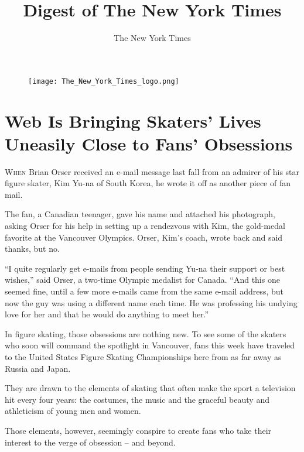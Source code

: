 ﻿\documentclass[12pt]{article}
\title{Digest of The New York Times}
\author{The New York Times}
\begin{document}
\date{}
\thispagestyle{empty}

\begin{figure}
\texttt{[image: The\_New\_York\_Times\_logo.png]}
\vspace{-15ex}
\end{figure}
\renewcommand\contentsname{}
{\footnotesize\textsf{\tableofcontents}}

\clearpage
\setcounter{page}{1}

\section{Web Is Bringing Skaters' Lives Uneasily Close to Fans' Obsessions}

\lettrine{W}{hen} Brian Orser received an e-mail message last fall from an
admirer of his star figure skater, Kim Yu-na of South Korea, he wrote it off as another piece of fan
mail.


The fan, a Canadian teenager, gave his name and attached his photograph, asking Orser for his help
in setting up a rendezvous with Kim, the gold-medal favorite at the Vancouver Olympics. Orser, Kim's
coach, wrote back and said thanks, but no.

``I quite regularly get e-mails from people sending Yu-na their support or best wishes,'' said
Orser, a two-time Olympic medalist for Canada. ``And this one seemed fine, until a few more e-mails
came from the same e-mail address, but now the guy was using a different name each time. He was
professing his undying love for her and that he would do anything to meet her.''

In figure skating, those obsessions are nothing new. To see some of the skaters who soon will
command the spotlight in Vancouver, fans this week have traveled to the United States Figure Skating
Championships here from as far away as Russia and Japan.

They are drawn to the elements of skating that often make the sport a television hit every four
years: the costumes, the music and the graceful beauty and athleticism of young men and women.

Those elements, however, seemingly conspire to create fans who take their interest to the verge of
obsession -- and beyond.
\end{document}
